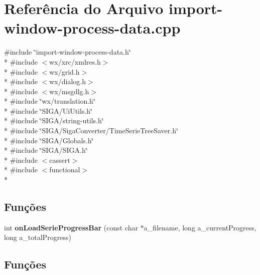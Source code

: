 \section{Referência do Arquivo import-\/window-\/process-\/data.cpp}
\label{import-window-process-data_8cpp}
{\ttfamily \#include \char`\"{}import-\/window-\/process-\/data.\+h\char`\"{}}\\*
{\ttfamily \#include $<$wx/xrc/xmlres.\+h$>$}\\*
{\ttfamily \#include $<$wx/grid.\+h$>$}\\*
{\ttfamily \#include $<$wx/dialog.\+h$>$}\\*
{\ttfamily \#include $<$wx/msgdlg.\+h$>$}\\*
{\ttfamily \#include \char`\"{}wx/translation.\+h\char`\"{}}\\*
{\ttfamily \#include \char`\"{}S\+I\+G\+A/\+Ui\+Utils.\+h\char`\"{}}\\*
{\ttfamily \#include \char`\"{}S\+I\+G\+A/string-\/utils.\+h\char`\"{}}\\*
{\ttfamily \#include \char`\"{}S\+I\+G\+A/\+Siga\+Converter/\+Time\+Serie\+Tree\+Saver.\+h\char`\"{}}\\*
{\ttfamily \#include \char`\"{}S\+I\+G\+A/\+Globals.\+h\char`\"{}}\\*
{\ttfamily \#include \char`\"{}S\+I\+G\+A/\+S\+I\+G\+A.\+h\char`\"{}}\\*
{\ttfamily \#include $<$cassert$>$}\\*
{\ttfamily \#include $<$functional$>$}\\*
\subsection*{Funções}
\begin{DoxyCompactItemize}
\item 
int {\bf on\+Load\+Serie\+Progress\+Bar} (const char $\ast$a\+\_\+filename, long a\+\_\+current\+Progress, long a\+\_\+total\+Progress)
\end{DoxyCompactItemize}


\subsection{Funções}
